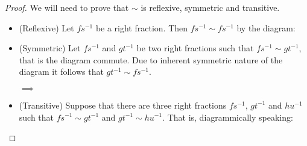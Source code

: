 \documentclass[12pt]{article}
\theoremstyle{definition}
\theoremstyle{remark}
\begin{document}
            \begin{proof}
                We will need to prove that $\sim$ is reflexive, symmetric and transitive.
                \begin{itemize}
                    \item (Reflexive) Let $fs^{-1}$ be a right fraction. Then $fs^{-1}\sim fs^{-1}$ by the diagram:
                    \begin{center}
                    \end{center}
                    \item (Symmetric) Let $fs^{-1}$ and $gt^{-1}$ be two right fractions such that $fs^{-1}\sim gt^{-1}$, that is the diagram commute. Due to inherent symmetric nature of the diagram it follows that $gt^{-1}\sim fs^{-1}$.
                    \begin{center}
                        $\implies$
                    \end{center}
                    \item (Transitive) Suppose that there are three right fractions $fs^{-1}$, $gt^{-1}$ and $hu^{-1}$ such that $fs^{-1}\sim gt^{-1}$ and $gt^{-1}\sim hu^{-1}$. That is, diagrammically speaking:
                    \begin{center}

\end{center}
\end{itemize}
\end{proof}
\end{document}
